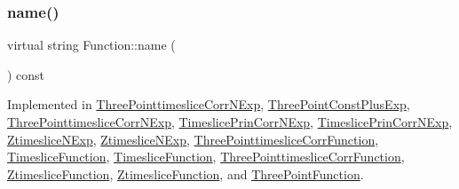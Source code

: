\subsubsection{\texorpdfstring{name()}{name()}\hspace{0.1cm}{\footnotesize\ttfamily [2/2]}}
{\footnotesize\ttfamily virtual string Function\+::name (\begin{DoxyParamCaption}{ }\end{DoxyParamCaption}) const\hspace{0.3cm}{\ttfamily [pure virtual]}}



Implemented in \mbox{\hyperlink{classThreePointtimesliceCorrNExp_aa137e909c6466275f495aac9f2d24178}{Three\+Pointtimeslice\+Corr\+N\+Exp}}, \mbox{\hyperlink{classThreePointConstPlusExp_ad7943ef83c3c7b511612e030797ece4a}{Three\+Point\+Const\+Plus\+Exp}}, \mbox{\hyperlink{classThreePointtimesliceCorrNExp_aa137e909c6466275f495aac9f2d24178}{Three\+Pointtimeslice\+Corr\+N\+Exp}}, \mbox{\hyperlink{classTimeslicePrinCorrNExp_a02d5af4384f14f17322e865c882c5b15}{Timeslice\+Prin\+Corr\+N\+Exp}}, \mbox{\hyperlink{classTimeslicePrinCorrNExp_a02d5af4384f14f17322e865c882c5b15}{Timeslice\+Prin\+Corr\+N\+Exp}}, \mbox{\hyperlink{classZtimesliceNExp_a012d885734f62a67b2d1ffc0d4128b0b}{Ztimeslice\+N\+Exp}}, \mbox{\hyperlink{classZtimesliceNExp_a012d885734f62a67b2d1ffc0d4128b0b}{Ztimeslice\+N\+Exp}}, \mbox{\hyperlink{classThreePointtimesliceCorrFunction_ad364af81f908825603c7810afdb7cb2d}{Three\+Pointtimeslice\+Corr\+Function}}, \mbox{\hyperlink{classTimesliceFunction_addfcdb96287c354039a1536879cfe787}{Timeslice\+Function}}, \mbox{\hyperlink{classTimesliceFunction_addfcdb96287c354039a1536879cfe787}{Timeslice\+Function}}, \mbox{\hyperlink{classThreePointtimesliceCorrFunction_ad364af81f908825603c7810afdb7cb2d}{Three\+Pointtimeslice\+Corr\+Function}}, \mbox{\hyperlink{classZtimesliceFunction_a3c98a40a6155270bbb11d74c1b0f838c}{Ztimeslice\+Function}}, \mbox{\hyperlink{classZtimesliceFunction_a3c98a40a6155270bbb11d74c1b0f838c}{Ztimeslice\+Function}}, and \mbox{\hyperlink{classThreePointFunction_a4231093b53df2f82f4821a663ac8249f}{Three\+Point\+Function}}.

